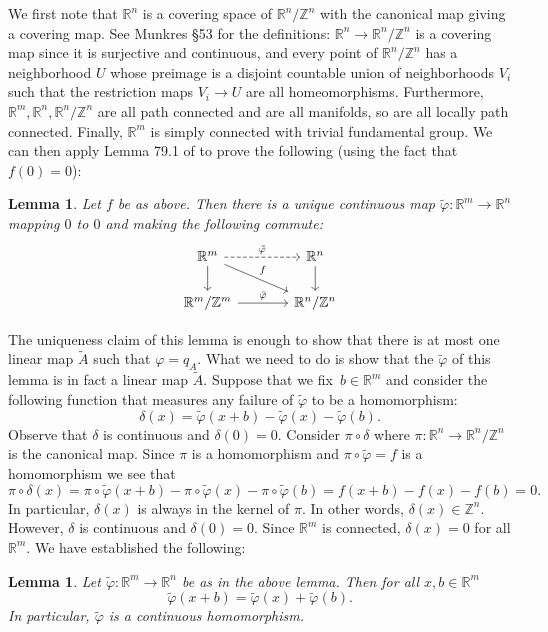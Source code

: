 \documentclass[12pt]{amsart}
\theoremstyle{plain}
\newtheorem{lemma}[theorem]{Lemma}
\theoremstyle{definition}
\theoremstyle{remark}
\numberwithin{theorem}{section}
\numberwithin{equation}{section} %
\newcommand{\bZ}{{\mathbb{Z}}}
\newcommand{\bR}{{\mathbb{R}}}
\begin{document}
We first note that $\bR^n$ is a covering space of $\bR^n/\bZ^n$ with the canonical map giving a covering map.
See Munkres \S 53 \cite{munkres} for the definitions:  $\bR^n \to \bR^n/\bZ^n$ is a covering map since it is surjective and continuous, and every point of $\bR^n/\bZ^n$ has a neighborhood $U$
whose preimage is a disjoint countable union of neighborhoods $V_i$ such that the restriction  maps $V_i \to U$ are all homeomorphisms.
Furthermore, $\bR^m, \bR^n, \bR^n/\bZ^n$ are all path connected and are  all manifolds, so are all locally path connected. Finally, $\bR^m$ is simply connected with trivial fundamental group.
We can then apply Lemma 79.1 of \cite{munkres} to prove the following (using the fact that~$f(0) = 0$):

\begin{lemma}
Let $f$ be as above. Then there is a unique continuous map $\tilde \varphi \colon \bR^m \to \bR^n$ mapping $0$ to $0$ and making the following commute:
 $$
 \begin{tikzcd} [column sep = large]
\bR^m  \arrow[r, dashed, "\tilde \varphi"]  \arrow[d] \arrow[rd, "f"] & \bR^n \arrow[d]    \\
\bR^m/\bZ^m  \arrow[r, "\bar \varphi"] & \bR^n/\bZ^n 
\end{tikzcd}
$$
\end{lemma}

The uniqueness claim of this lemma is enough to show that there is at most one linear map $\tilde A$ such that $\varphi = q_A$.
What we need to do is show that the $\tilde \varphi$ of this lemma is in fact a linear map $\tilde A$. Suppose that we fix~$b \in \bR^m$ and consider the following function that measures
any failure of $\tilde \varphi$ to be a homomorphism:
$$
\delta (x) = \tilde \varphi (x+b) - \tilde\varphi(x) - \tilde\varphi(b).
$$
Observe that $\delta$ is continuous and $\delta(0) = 0$.
Consider $\pi \circ \delta$ where $\pi \colon \bR^n \to \bR^n/\bZ^n$ is the canonical map.
Since $\pi$ is a homomorphism and $\pi \circ \tilde \varphi = f$ is a homomorphism we see that 
$$
\pi \circ \delta (x) = \pi \circ \tilde \varphi  (x+b) - \pi \circ \tilde \varphi (x) - \pi \circ \tilde \varphi   (b) = f (x+b) - f (x) - f  (b) = 0.
$$
In particular, $\delta(x)$ is always in the kernel of $\pi$. In other words, $\delta(x) \in \bZ^n$. However, $\delta$ is continuous and $\delta(0) = 0$. Since $\bR^m$ is connected, 
$\delta(x) = 0$ for all $\bR^m$. We have established the following:

\begin{lemma}
Let $\tilde \varphi \colon \bR^m \to \bR^n$ be as in the above lemma. Then for all $x, b \in \bR^m$
$$
\tilde\varphi(x+b) = \tilde\varphi(x) + \tilde\varphi(b).
$$
In particular, $\tilde\varphi$ is a continuous homomorphism.
\end{lemma}
\end{document}
